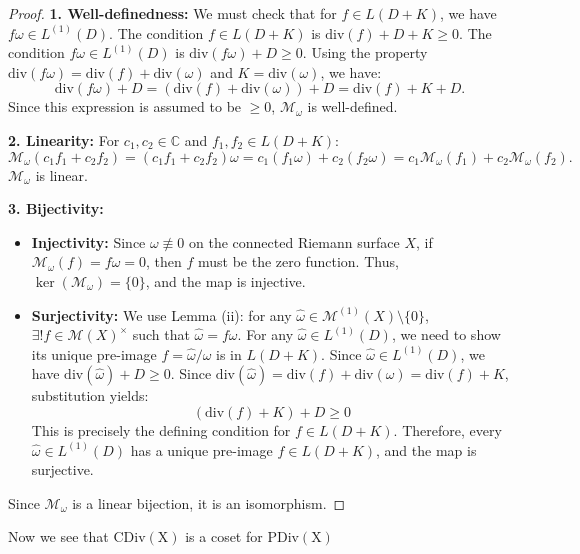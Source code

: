 \documentclass{article}
\begin{document}
\begin{proof}
\textbf{1. Well-definedness:}
We must check that for $f \in L(D+K)$, we have $f\omega \in L^{(1)}(D)$.
The condition $f \in L(D+K)$ is $\mathrm{div}(f) + D + K \ge 0$.
The condition $f\omega \in L^{(1)}(D)$ is $\mathrm{div}(f\omega) + D \ge 0$.
Using the property $\mathrm{div}(f\omega) = \mathrm{div}(f) + \mathrm{div}(\omega)$ and $K = \mathrm{div}(\omega)$, we have:
$$\mathrm{div}(f\omega) + D = (\mathrm{div}(f) + \mathrm{div}(\omega)) + D = \mathrm{div}(f) + K + D.$$
Since this expression is assumed to be $\ge 0$, $\mathcal{M}_\omega$ is well-defined.

\textbf{2. Linearity:}
For $c_1, c_2 \in \mathbb{C}$ and $f_1, f_2 \in L(D+K)$:
$$\mathcal{M}_\omega(c_1 f_1 + c_2 f_2) = (c_1 f_1 + c_2 f_2)\omega = c_1 (f_1 \omega) + c_2 (f_2 \omega) = c_1 \mathcal{M}_\omega(f_1) + c_2 \mathcal{M}_\omega(f_2).$$
$\mathcal{M}_\omega$ is linear.

\textbf{3. Bijectivity:}
\begin{itemize}
    \item \textbf{Injectivity:} Since $\omega \not\equiv 0$ on the connected Riemann surface $X$, if $\mathcal{M}_\omega(f) = f\omega = 0$, then $f$ must be the zero function. Thus, $\ker(\mathcal{M}_\omega) = \{0\}$, and the map is injective.
    \item \textbf{Surjectivity:}
    We use Lemma (ii): for any $\hat{\omega} \in \mathcal{M}^{(1)}(X) \setminus \{0\}$, $\exists ! f \in \mathcal{M}(X)^\times$ such that $\hat{\omega} = f\omega$.
    For any $\hat{\omega} \in L^{(1)}(D)$, we need to show its unique pre-image $f = \hat{\omega}/\omega$ is in $L(D+K)$.
    Since $\hat{\omega} \in L^{(1)}(D)$, we have $\mathrm{div}(\hat{\omega}) + D \ge 0$.
    Since $\mathrm{div}(\hat{\omega}) = \mathrm{div}(f) + \mathrm{div}(\omega) = \mathrm{div}(f) + K$, substitution yields:
    $$(\mathrm{div}(f) + K) + D \ge 0$$
    This is precisely the defining condition for $f \in L(D+K)$.
    Therefore, every $\hat{\omega} \in L^{(1)}(D)$ has a unique pre-image $f \in L(D+K)$, and the map is surjective.
\end{itemize}
Since $\mathcal{M}_\omega$ is a linear bijection, it is an isomorphism.
\end{proof}


\begin{remark}
    Now we see that $\operatorname{CDiv(X)}$ is a coset for $\operatorname{PDiv(X)}$
\end{remark}

\newpage
\appendix
\end{document}
